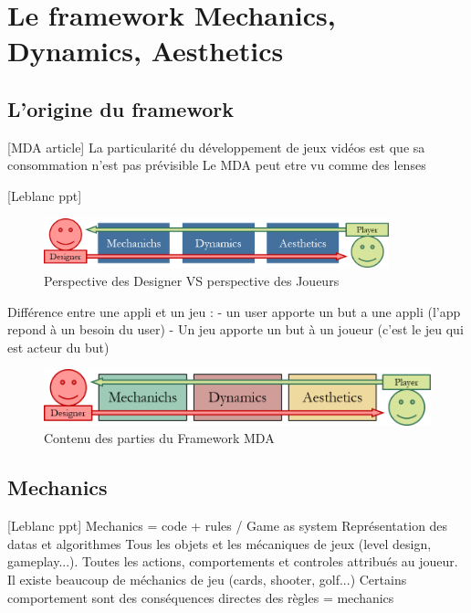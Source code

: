 \chapter{Le framework Mechanics, Dynamics, Aesthetics}



\section{L'origine du framework}
[MDA article]
La particularité du développement de jeux vidéos est que sa consommation n'est pas prévisible
Le MDA peut etre vu comme des lenses

[Leblanc ppt]
\begin{figure}[H]
    \centering
    \includegraphics[width=10cm]{10_img/chap3/desvspla.png} 
    \caption{Perspective des Designer VS perspective des Joueurs \cite{MDA_formal}}
\end{figure}
Différence entre une appli et un jeu : 
- un user apporte un but a une appli (l'app repond à un besoin du user)
- Un jeu apporte un but à un joueur (c'est le jeu qui est acteur du but)

\begin{figure}[H]
    \centering
    \includegraphics[width=14cm]{10_img/chap3/mda.png} 
    \caption{Contenu des parties du Framework MDA \cite{MDA_formal}}
\end{figure}


\section{Mechanics}
[Leblanc ppt] Mechanics = code + rules / Game as system
Représentation des datas et algorithmes
Tous les objets et les mécaniques de jeux (level design, gameplay...).
Toutes les actions, comportements et controles attribués au joueur.
Il existe beaucoup de méchanics de jeu (cards, shooter, golf...)
Certains comportement sont des conséquences directes des règles = mechanics


